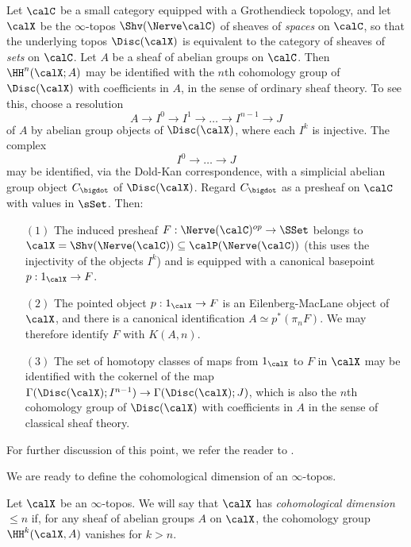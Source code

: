 \begin{remark}\label{compfood}
Let $\calC$ be a small category equipped with a Grothendieck topology, and let
$\calX$ be the $\infty$-topos $\Shv( \Nerve \calC)$ of sheaves of {\em spaces} on
$\calC$, so that the underlying topos $\Disc(\calX)$ is equivalent to the category of sheaves of {\em sets} on $\calC$. Let $A$ be a sheaf of abelian groups on $\calC$.
Then $\HH^{n}(\calX;A)$ may be identified with the $n$th cohomology group of $\Disc(\calX)$ with coefficients in $A$, in the sense of ordinary sheaf theory. To see this, choose a resolution
$$ A \rightarrow I^0 \rightarrow I^1 \rightarrow \ldots \rightarrow I^{n-1} \rightarrow J$$
of $A$ by abelian group objects of $\Disc(\calX)$, where each $I^{k}$ is injective. The complex
$$ I^0 \rightarrow \ldots \rightarrow J$$
may be identified, via the Dold-Kan correspondence, with a simplicial abelian group object
$C_{\bigdot}$ of $\Disc(\calX)$. Regard $C_{\bigdot}$ as a presheaf on $\calC$ with values in $\sSet$. Then:
\begin{itemize}
\item[$(1)$] The induced presheaf $F: \Nerve(\calC)^{op} \rightarrow \SSet$ belongs to
$\calX = \Shv(\Nerve(\calC)) \subseteq \calP( \Nerve(\calC))$ (this uses the injectivity
of the objects $I^k$) and is equipped with a canonical basepoint $p: 1_{\calX} \rightarrow F$.
\item[$(2)$] The pointed object $p: 1_{\calX} \rightarrow F$ is an Eilenberg-MacLane object of $\calX$, and there is a canonical identification $A \simeq p^{\ast}(\pi_n F)$. We may therefore identify
$F$ with $K(A,n)$.
\item[$(3)$] The set of homotopy classes of maps from $1_{\calX}$ to $F$ in $\calX$ may be identified with
the cokernel of the map $\Gamma( \Disc(\calX); I^{n-1} ) \rightarrow \Gamma( \Disc(\calX); J)$, which is
also the $n$th cohomology group of $\Disc(\calX)$ with coefficients in $A$ in the sense of classical sheaf theory.
\end{itemize} 
For further discussion of this point, we refer the reader to \cite{jardine}.
\end{remark}

We are ready to define the cohomological dimension of an $\infty$-topos.

\begin{definition}\label{codimmm}
Let $\calX$ be an $\infty$-topos. We will say that $\calX$ has
{\it cohomological dimension $\leq n$} if, for any sheaf of
abelian groups $A$ on $\calX$, the cohomology group $\HH^k(\calX,A)$ vanishes for
$k > n$.
\end{definition}

